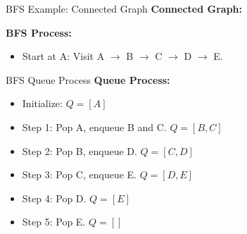 \documentclass{beamer}
\begin{document}
\begin{frame}{BFS Example: Connected Graph}
    \textbf{Connected Graph:}

    \begin{center}
    \end{center}
    
    \textbf{BFS Process:}
    \begin{itemize}
        \item Start at A: Visit A $\rightarrow$ B $\rightarrow$ C $\rightarrow$ D $\rightarrow$ E.
    \end{itemize}
\end{frame}


\begin{frame}{BFS Queue Process} 
    \textbf{Queue Process:}
    \begin{itemize}
        \item Initialize: \( Q = [A] \)
        \item Step 1: Pop A, enqueue B and C. \( Q = [B, C] \)
        \item Step 2: Pop B, enqueue D. \( Q = [C, D] \)
        \item Step 3: Pop C, enqueue E. \( Q = [D, E] \)
        \item Step 4: Pop D. \( Q = [E] \)
        \item Step 5: Pop E. \( Q = [] \)
    \end{itemize}
\end{frame}
\end{document}
